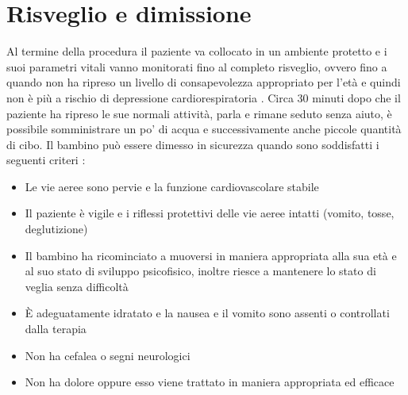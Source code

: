 \section{Risveglio e dimissione}

Al termine della procedura il paziente va collocato in un ambiente protetto e i suoi parametri vitali vanno monitorati fino al completo risveglio, ovvero fino a quando non ha ripreso un livello di consapevolezza appropriato per l'età e quindi non è più a rischio di depressione cardiorespiratoria \cite{Krauss2006}. Circa 30 minuti dopo che il paziente ha ripreso le sue normali attività, parla e rimane seduto senza aiuto, è possibile somministrare un po' di acqua e successivamente anche piccole quantità di cibo. Il bambino può essere dimesso in sicurezza quando sono soddisfatti i seguenti criteri \cite{Uptodatesed, Simeupsedazione}: 
\begin{itemize}
    \item Le vie aeree sono pervie e la funzione cardiovascolare stabile
    \item Il paziente è vigile e i riflessi protettivi delle vie aeree intatti (vomito, tosse, deglutizione)
    \item Il bambino ha ricominciato a muoversi in maniera appropriata alla sua età e al suo stato di sviluppo psicofisico, inoltre riesce a mantenere lo stato di veglia senza difficoltà
    \item \`E adeguatamente idratato e la nausea e il vomito sono assenti o controllati dalla terapia
    \item Non ha cefalea o segni neurologici
    \item Non ha dolore oppure esso viene trattato in maniera appropriata ed efficace
\end{itemize}